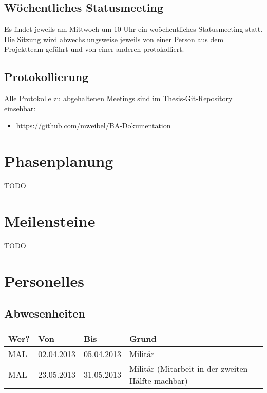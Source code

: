 \subsection{Wöchentliches Statusmeeting}
Es findet jeweils am Mittwoch um 10 Uhr ein woöchentliches Statusmeeting statt. Die Sitzung wird abwechslungsweise jeweils von einer Person aus dem Projektteam geführt und von einer anderen protokolliert.

\subsection{Protokollierung}
Alle Protokolle zu abgehaltenen Meetings sind im Thesis-Git-Repository einsehbar:

\begin{itemize}
	\item https://github.com/mweibel/BA-Dokumentation
\end{itemize}

\section{Phasenplanung}
TODO

\section{Meilensteine}
TODO


\section{Personelles}
\subsection{Abwesenheiten}
\begin{tabular}{l l l l}
\textbf{Wer?} & \textbf{Von} & \textbf{Bis} & \textbf{Grund} \\
\hline
MAL & 02.04.2013 & 05.04.2013 & Militär \\
MAL & 23.05.2013 & 31.05.2013 & Militär (Mitarbeit in der zweiten Hälfte machbar) \\
\end{tabular}